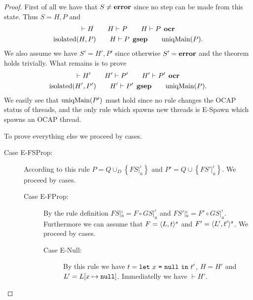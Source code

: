 \begin{proof} 
  First of all we have that $S \neq \mbox{{\bf error}}$ since no step can be made from this
  state. Thus $S = H, P$ and
  \begin{equation*}
    \begin{gathered}
      \vdash H \quad\quad H \vdash P \quad\quad H \vdash P \:\: \mbox{\bf ocr} \\
      \mbox{$\mathrm{isolated}$}{(H, P)} \quad\quad H \vdash P \:\: \mbox{\bf gsep} \quad\quad \mbox{$\mathrm{uniqMain}$}(P).
    \end{gathered}
  \end{equation*}
  We also assume we have $S' = H', P'$ since otherwise $S' = \mbox{{\bf error}}$ and the
  theorem holds trivially. What remains is to prove
  \begin{equation*}
    \begin{gathered}
      \vdash H' \quad\quad H' \vdash P' \quad\quad H' \vdash P' \:\: \mbox{\bf ocr} \\
      \mbox{$\mathrm{isolated}$}{(H', P')} \quad\quad H' \vdash P' \:\: \mbox{\bf gsep} \quad\quad
      \mbox{$\mathrm{uniqMain}$}(P).
    \end{gathered}
  \end{equation*}
  We easily see that $\mbox{$\mathrm{uniqMain}$}(P')$ must hold since no rule changes the OCAP
  status of threads, and the only rule which spawns new threads is {\sc E-Spawn}
  which spawns an OCAP thread.

  To prove everything else we proceed by cases.
  \begin{description}
    \item[Case {\sc E-FSProp}:] According to this rule $P = Q \cup_D \left\{
        FS|_a^\iota \right\}$ and $P' = Q \cup \left\{ FS'|_a^\iota \right\}$. We proceed by cases.
      \begin{description}
        \item[Case {\sc E-FProp}:] By the rule definition $FS|_a^\iota = F \circ
          GS|_a^\iota$ and $FS'|_a^\iota = F' \circ GS|_a^\iota$. Furthermore we can assume
          that $F = \mbox{$\langle L, t \rangle^s$}$ and $F' = \mbox{$\langle L', t' \rangle^s$}$.
          We proceed by cases.
          \begin{description}
            \item[Case {\sc E-Null}:] By this rule we have $t =
              \mbox{\mdseries\texttt{let}~$x$~\texttt{=}~$\mbox{\mdseries\texttt{null}}$~\texttt{in}~$t'$}$, $H = H'$ and $L' = L[x \mapsto \mbox{\mdseries\texttt{null}}]$.
              Immediatelly we have $\vdash H'$.


\end{description}
\end{description}
\end{description}
\end{proof}

